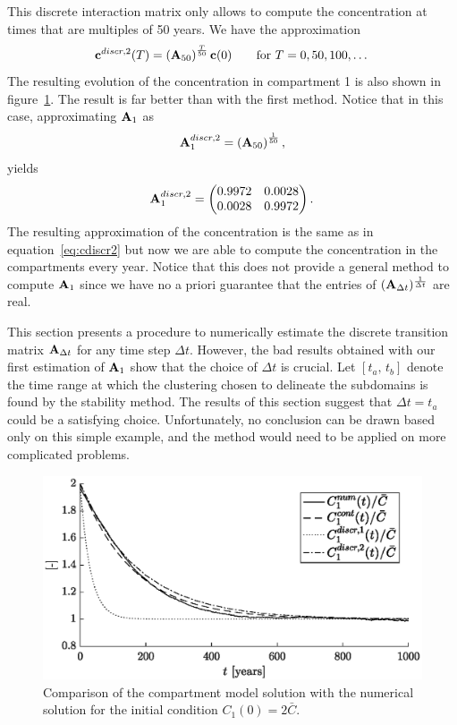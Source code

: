 This discrete interaction matrix only allows to compute the concentration at times that are multiples of 50 years. We have the approximation
\begin{equation} \label{eq:cdiscr2}
	\mathbf c^{discr,2}(T) = \left(\mathbf A_{50}\right)^{\frac{T}{50}} \mathbf c(0) \qquad \mbox{for } T = 0,50,100,\dots
\end{equation}
The resulting evolution of the concentration in compartment 1 is also shown in figure~\ref{fig:comparison_comp-real1}. The result is far better than with the first method. Notice that in this case, approximating $\mathbf A_1$ as
\begin{equation}
	\mathbf A_1^{discr,2} = \left(\mathbf A_{50}\right)^{\frac{1}{50}},
\end{equation}
yields
\begin{equation}
	\mathbf A_1^{discr,2} = \begin{pmatrix}
		0.9972 & 0.0028 \\ 
		0.0028 & 0.9972
	\end{pmatrix}.
\end{equation}
The resulting approximation of the concentration is the same as in equation~\eqref{eq:cdiscr2} but now we are able to compute the concentration in the compartments every year. Notice that this does not provide a general method to compute $\mathbf A_1$ since we have no a priori guarantee that the entries of $(\mathbf A_{\Delta t})^{\frac{1}{\Delta t}}$ are real.

This section presents a procedure to numerically estimate the discrete transition matrix $\mathbf A_{\Delta t}$ for any time step $\Delta t$. However, the bad results obtained with our first estimation of $\mathbf A_1$ show that the choice of $\Delta t$ is crucial. Let $[t_a,\, t_b]$ denote the time range at which the clustering chosen to delineate the subdomains is found by the stability method. The results of this section suggest that $\Delta t = t_a$ could be a satisfying choice. Unfortunately, no conclusion can be drawn based only on this simple example, and the method would need to be applied on more complicated problems.

\begin{figure}[!htp]
	\centering
	\includegraphics[scale=1]{fig/problem2box/C1vsC1tilde1_1000years2.eps}
	\caption{Comparison of the compartment model solution with the numerical solution for the initial condition $C_1(0) = 2\bar C$.}
	\label{fig:comparison_comp-real1}
\end{figure}